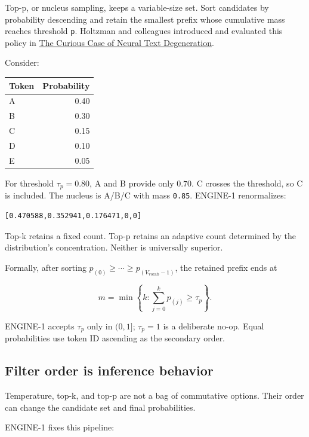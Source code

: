 \documentclass[
  10pt,
]{article}
\newcounter{none} %
\begin{document}
Top-p, or nucleus sampling, keeps a variable-size set. Sort candidates
by probability descending and retain the smallest prefix whose
cumulative mass reaches threshold \texttt{p}. Holtzman and colleagues
introduced and evaluated this policy in
\href{https://arxiv.org/abs/1904.09751}{The Curious Case of Neural Text
Degeneration}.

Consider:

{\def\LTcaptype{none} %
\begin{longtable}[]{@{}lr@{}}
\toprule\noalign{}
Token & Probability \\
\midrule\noalign{}
\endhead
\bottomrule\noalign{}
\endlastfoot
A & 0.40 \\
B & 0.30 \\
C & 0.15 \\
D & 0.10 \\
E & 0.05 \\
\end{longtable}
}

For threshold \(\tau_p=0.80\), A and B provide only \(0.70\). C crosses
the threshold, so C is included. The nucleus is A/B/C with mass
\texttt{0.85}. ENGINE-1 renormalizes:

\begin{verbatim}
[0.470588,0.352941,0.176471,0,0]
\end{verbatim}

Top-k retains a fixed count. Top-p retains an adaptive count determined
by the distribution's concentration. Neither is universally superior.

Formally, after sorting
\(p_{(0)}\ge\cdots\ge p_{(V_{\mathrm{vocab}}-1)}\), the retained prefix
ends at

\[
m=\min\left\{k:\sum_{j=0}^{k}p_{(j)}\ge\tau_p\right\}.
\]

ENGINE-1 accepts \(\tau_p\) only in \((0,1]\); \(\tau_p=1\) is a
deliberate no-op. Equal probabilities use token ID ascending as the
secondary order.

\subsection{Filter order is inference
behavior}\label{filter-order-is-inference-behavior}

Temperature, top-k, and top-p are not a bag of commutative options.
Their order can change the candidate set and final probabilities.

ENGINE-1 fixes this pipeline:
\end{document}
